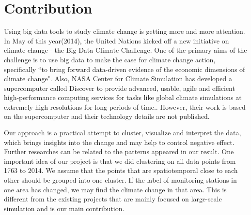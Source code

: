 \section{Contribution}
Using big data tools to study climate change is getting more and more attention. In May of this year(2014), the United Nations kicked off a new initiative on climate change - the Big Data Climate Challenge\cite{climatechallenge}. One of the primary aims of the challenge is to use big data to make the case for climate change action, specifically ``to bring forward data-driven evidence of the economic dimensions of climate change". Also, NASA Center for Climate Simulation has developed a supercomputer called Discover to provide advanced, usable, agile and efficient high-performance computing services for tasks like global climate simulations at extremely high resolutions for long periods of time.\cite{nasa}. However, their work is based on the supercomputer and their technology details are not published. 

Our approach is a practical attempt to cluster, visualize and interpret the data, which brings insights into the change and may help to control negative effect. Further researches can be related to the patterns appeared in our result. One important idea of our project is that we did clustering on all data points from 1763 to 2014. We assume that the points that are spatiotemporal close to each other should be grouped into one cluster. If the label of monitoring stations in one area has changed, we may find the climate change in that area. This is different from the existing projects that are mainly focused on large-scale simulation and is our main contribution. 



